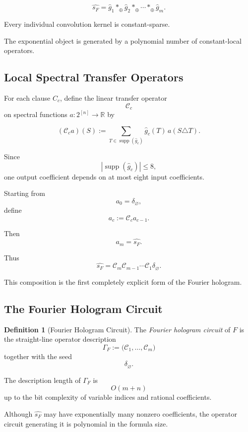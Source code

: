 \documentclass[11pt]{article}
\theoremstyle{plain}
\theoremstyle{definition}
\newtheorem{definition}[theorem]{Definition}
\begin{document}
\[
\boxed{
\widehat{s_F}
=
\widehat g_1
*_\oplus
\widehat g_2
*_\oplus
\cdots
*_\oplus
\widehat g_m.
}
\]

Every individual convolution kernel is constant-sparse.

The exponential object is generated by a polynomial number of constant-local
operators.

\subsection{Local Spectral Transfer Operators}

For each clause \(C_c\), define the linear transfer operator
\[
    \mathcal{C}_c
\]
on spectral functions \(a:2^{[n]}\to\mathbb{R}\) by

\[
    (\mathcal{C}_c a)(S)
    :=
    \sum_{T\in\operatorname{supp}(\widehat g_c)}
    \widehat g_c(T)\,
    a(S\triangle T).
\]

Since
\[
    |\operatorname{supp}(\widehat g_c)|\leq 8,
\]
one output coefficient depends on at most eight input coefficients.

Starting from
\[
    a_0=\delta_{\varnothing},
\]
define
\[
    a_c:=\mathcal{C}_c a_{c-1}.
\]

Then
\[
    a_m=\widehat{s_F}.
\]

Thus
\[
\boxed{
\widehat{s_F}
=
\mathcal{C}_m
\mathcal{C}_{m-1}
\cdots
\mathcal{C}_1
\delta_{\varnothing}.
}
\]

This composition is the first completely explicit form of the Fourier
hologram.

\subsection{The Fourier Hologram Circuit}

\begin{definition}[Fourier Hologram Circuit]
\label{def:fourier-hologram-circuit}
The \emph{Fourier hologram circuit} of \(F\) is the straight-line operator
description
\[
    \Gamma_F
    :=
    \bigl(
        \mathcal{C}_1,
        \dots,
        \mathcal{C}_m
    \bigr)
\]
together with the seed
\[
    \delta_{\varnothing}.
\]
\end{definition}

The description length of \(\Gamma_F\) is
\[
    O(m+n)
\]
up to the bit complexity of variable indices and rational coefficients.

Although \(\widehat{s_F}\) may have exponentially many nonzero coefficients,
the operator circuit generating it is polynomial in the formula size.
\end{document}
